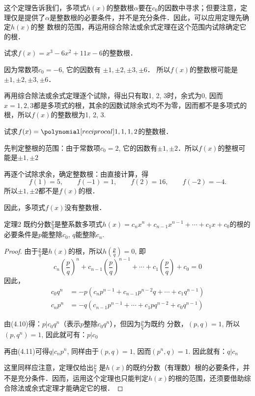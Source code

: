 这个定理告诉我们，多项式$h(x)$的整数根$\alpha$要在$c_0$的因数中寻求；但要注意，定理仅是提供了$\alpha$是整数根的必要条件，并不是充分条件．因此，可以应用定理先确定$h(x)$的整
数根的范围，再运用综合除法或余式定理在这个范围内试除确定它的根．

\begin{example}
    试求$f(x)=x^3-6x^2+11x-6$的整数根．
\end{example}

\begin{solution}
    因为常数项$c_0=-6$, 它的因数有
$\pm 1, \pm 2, \pm 3, \pm 6$．
所以$f(x)$的整数根可能是$\pm 1, \pm 2,\pm 3,\pm 6$．

再用综合除法或余式定理逐个试除，得出只有取1, 2, 3时，余式为0, 因而$x=1, 2, 3$都是多项式的根，其余的因数试除余式均不为零，因而都不是多项式的根，所以$f(x)$的整数根为1, 2, 3.
\end{solution}

\begin{example}
    试求$f(x)=\poly{1,1,1,2}$的整数根．
\end{example}

\begin{solution}
    先判定整根的范围：由于常数项$c_0=2$, 它的因数有$\pm 1,\pm 2$．所以$f(x)$的整根可能是$\pm 1,\pm 2$
    
    再逐个试除求余，确定整数根：由直接计算，得
\[f (1) =5,\qquad f (-1) =1,\qquad f (2) =16,\qquad f (-2) =-4.\]
所以$\pm 1,\pm 2$都不是$f(x)$的根．

因此，多项式$f(x)$没有整数根．
\end{solution}

\begin{blk}{定理2}
    既约分数$\frac{p}{q}$是整系数多项式$h (x) =c_nx^n+c_{n-1}x^{n-1}+\cdots+c_1x+c_0$的根的必要条件是$p$能整除$c_0$, $q$能整除$c_n$.
\end{blk}

\begin{proof}
    由于$\frac{p}{q}$是$h(x)$的根，所以$h\left(\frac{p}{q}\right)=0$, 即
\[c_n\left(\frac{p}{q}\right)^{n}+c_{n-1}\left(\frac{p}{q}\right)^{n-1}+\cdots +c_1\left(\frac{p}{q}\right)+c_0=0\]
因此，
\begin{align}
c_0q^n&= -p\left(c_np^{n-1}+c_{n-1}p^{n-2}q+\cdots+c_1q^{n-1}\right)\\
c_np^n&= -q\left(c_{n-1}p^{n-1}+\cdots+c_{1}pq^{n-2}+c_0q^{n-1}\right)   
\end{align}

由(4.10)得：$p|c_0q^n$（表示$p$整除$c_0q^n$），但因为$\frac{p}{q}$为既约
分数，$(p,q)=1$, 所以$(p,q^n)=1$, 因此就可有：$p|c_0$

再由(4.11)可得$q|c_np^n$, 同样由于$(p,q)=1$, 因而$(p^n,q)=1$. 因此就有：$q|c_n$

这里同样应注意，定理仅给出$\frac{p}{q}$
是$h(x)$的既约分数（有理数）根的必要条件，并不是充分条件．因而，运用这个定理也只能判定$h(x)$的根的范围，还须要借助综合除法或余式定理才能确定它的根．
\end{proof}


